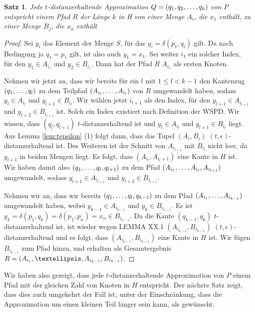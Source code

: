 \documentclass[11pt]{article}
\newtheorem{theorem}{Satz}[section]
\begin{document}
	\begin{theorem}
		\label{theo:Approx2H}
		Jede $t$-distanzerhaltende Approximation $Q = (q_1, q_2, \mathellipsis, q_k)$ von $P$ entspricht einem Pfad $R$ der Länge $k$ in H von einer Menge $A_i$, die $x_1$ enthält, zu einer Menge $B_j$, die $x_n$ enthält
	\end{theorem}
	\begin{proof}
		Sei $y_i$ das Element der Menge $S$, für das $y_i = \delta(p_1, q_i)$ gilt. Da nach Bedingung ja $q_1 = p_1$ gilt, ist also auch $y_1 = x_1$.
		Sei weiter $i_1$ ein solcher Index, für den $y_1 \in A_{i_1}$ und $y_2 \in B_{i_1}$. Dann hat der Pfad $R$ $A_{i_1}$ als ersten Knoten.
		
		Nehmen wir jetzt an, dass wir bereits für ein $l$ mit $1 \leq l < k-1$ den Kantenzug $(q_1, \mathellipsis, q_l)$ zu dem Teilpfad $(A_{i_1}, \mathellipsis, A_{i_l})$ von $R$ umgewandelt haben, sodass $y_l \in A_{i_l}$ und $y_{l+1} \in B_{i_l}$. Wir wählen jetzt $i_{l+1}$ als den Index, für den $y_{l+1} \in A_{i_{l+1}}$ und $y_{l+2} \in B_{i_{l+1}}$ ist. Solch ein Index existiert nach Definition der WSPD. Wir wissen, dass $(q_l, q_{l+1})$ $t$-distanzerhaltend ist und $y_l \in A_{i_l}$ und $y_{l+1} \in B_{i_l} $ liegt. Aus Lemma \ref{lem:tepsilon} (1) folgt dann, dass das Tupel $(A_i, B_i)$ $(t, \epsilon)$-distanzerhaltend ist. Des Weiteren ist der Schnitt von $A_{i_{l+1}}$ mit $B_{i_l}$ nicht leer, da $y_{l+1}$ in beiden Mengen liegt. Es folgt, dass $(A_{i_l}, A_{i_l+1})$ eine Kante in $H$ ist. Wir haben damit also $(q_1, \mathellipsis, q_l, q_{l+1})$ zu dem Pfad $(A_{i_1}, \mathellipsis, A_{i_l}, A_{i_{l+1}})$ umgewandelt, sodass $y_{l+1} \in A_{i_{l+1}}$ und $y_{l+2} \in B_{i_{l+1}}$.
		
		Nehmen wir an, dass wir bereits $(q_1, \mathellipsis, q_l, q_{k-1})$ zu dem Pfad $(A_{i_1}, \mathellipsis, A_{i_{k-1}})$ umgewandelt haben, wobei $y_{k-1} \in A_{i_{k-1}}$ und $y_k \in B_{i_{k-1}}$. Es ist $y_k = \delta(p_1, q_k) = \delta(p_1, p_n) = x_n \in B_{i_{k-1}}$. Da die Kante $(q_{k-1}, q_k)$ $t$-distanzerhaltend ist, ist wieder wegen LEMMA XX.1 $(A_{i_{k-1}}, B_{i_{k-1}})$ $(t, \epsilon)$-distanzerhaltend und es folgt, dass $(A_{i_{k-1}}, B_{i_{k-1}})$ eine Kante in $H$ ist. Wir fügen $B_{i_{k-1}}$ zum Pfad hinzu, und erhalten als Gesamtergebnis $R = (A_{i_1}, \textellipsis, A_{i_{k-1}}, B_{i_{k-1}})$.
	\end{proof}
	
	Wir haben also gezeigt, dass jede $t$-distanzerhaltende Approximation von $P$ einem Pfad mit der gleichen Zahl von Knoten in $H$ entspricht. Der nächste Satz zeigt, dass dies auch umgekehrt der Fall ist, unter der Einschränkung, dass die Approximation um einen kleinen Teil länger sein kann, als gewünscht.
	
\end{document}
